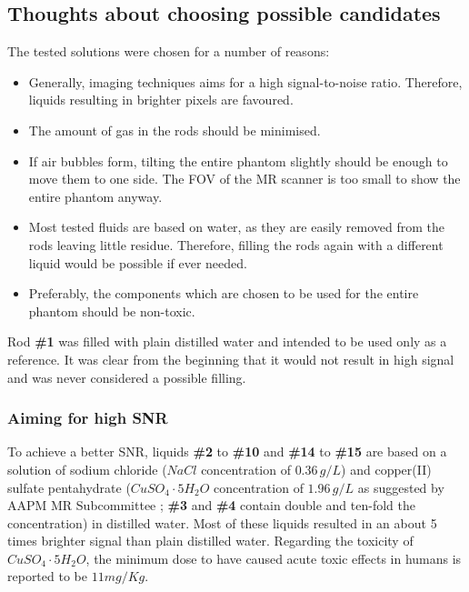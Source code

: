 \subsection{Thoughts about choosing possible candidates}

The tested solutions were chosen for a number of reasons:
\begin{itemize}
\item Generally, imaging techniques aims for a high signal-to-noise ratio. Therefore, liquids resulting in brighter pixels are favoured.
\item The amount of gas in the rods should be minimised.
\item If air bubbles form, tilting the entire phantom slightly should be enough to move them to one side. The FOV of the MR scanner is too small to show the entire phantom anyway.
\item Most tested fluids are based on water, as they are easily removed from the rods leaving little residue.
Therefore, filling the rods again with a different liquid would be possible if ever needed.
\item Preferably, the components which are chosen to be used for the entire phantom should be non-toxic.
\end{itemize}

\vspace{1cm}

Rod \textbf{\#1} was filled with plain distilled water and intended to be used only as a reference.
It was clear from the beginning that it would not result in high signal and was never considered a possible filling.

\subsubsection{Aiming for high SNR}
To achieve a better SNR, liquids \textbf{\#2} to \textbf{\#10} and \textbf{\#14} to \textbf{\#15} are based on a solution of sodium chloride ($NaCl$ concentration of $0.36 \, g/L$) and copper(II) sulfate pentahydrate ($CuSO_4\cdot5H_2O$ concentration of $1.96 \, g/L$ as suggested by AAPM MR Subcommittee \cite{Jackson2009};  \textbf{\#3} and \textbf{\#4} contain double and ten-fold the concentration) in distilled water.
Most of these liquids resulted in an about 5 times brighter signal than plain distilled water.
Regarding the toxicity of $CuSO_4\cdot5H_2O$, the minimum dose to have caused acute toxic effects in humans is reported to be $11 mg/Kg$.

